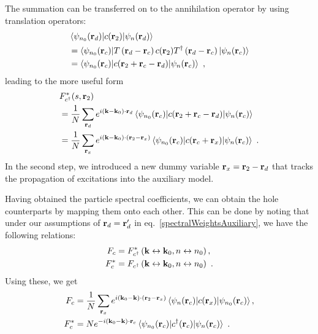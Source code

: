 \documentclass[reprint,hidelinks]{revtex4-2}
\begin{document}
The summation can be transferred on to the annihilation operator by using translation operators:
\begin{equation}\begin{aligned}
	&\braket{\psi_{n_0}({\bf r}_d)|c({\bf r}_2)|\psi_{n}({\bf r}_d)} \\
	&= \braket{\psi_{n_0}({\bf r}_c)|T\left({\bf r}_d - {\bf r}_c\right) c({\bf r}_2) T^\dagger\left({\bf r}_d - {\bf r}_c\right) |\psi_{n}({\bf r}_c)}\\
	&= \braket{\psi_{n_0}({\bf r}_c)| c({\bf r}_2 + {\bf r}_c - {\bf r}_d) |\psi_{n}({\bf r}_c)}~,
\end{aligned}\end{equation}
leading to the more useful form
\begin{equation}\begin{aligned}
	&F_{c^\dagger}^*(s, {\bf r}_2) \\
	&= \frac{1}{N}\sum_{{\bf r}_d} e^{i \left({\bf k}- {\bf k}_0\right)\cdot{\bf r}_d} \braket{\psi_{n_0}({\bf r}_c)| c({\bf r}_2 + {\bf r}_c - {\bf r}_d) |\psi_{n}({\bf r}_c)}\\
	&= \frac{1}{N}\sum_{{\bf r}_x} e^{i \left({\bf k}- {\bf k}_0\right)\cdot\left({\bf r}_2 - {\bf r}_x\right)} \braket{\psi_{n_0}({\bf r}_c)| c({\bf r}_c + {\bf r}_x) |\psi_{n}({\bf r}_c)}~.
\end{aligned}\end{equation}
In the second step, we introduced a new dummy variable \({\bf r}_x = {\bf r}_2 - {\bf r}_d\) that tracks the propagation of excitations into the auxiliary model.

Having obtained the particle spectral coefficients, we can obtain the hole counterparts by mapping them onto each other. This can be done by noting that under our assumptions of \({\bf r}_d = {\bf r}_d^\prime\) in eq.~\ref{spectralWeightsAuxiliary}, we have the following relations:
\begin{equation}\begin{aligned}
	F_{c} &= F_{c^\dagger}^*\left({\bf k}\leftrightarrow{\bf k}_0, n \leftrightarrow n_0\right),\\
	F_{c}^* &= F_{c^\dagger}\left({\bf k}\leftrightarrow{\bf k}_0, n \leftrightarrow n_0\right)~.
\end{aligned}\end{equation}
Using these, we get
\begin{equation}\begin{aligned}\label{spectralParticleHoleRelation}
	F_{c} &= \frac{1}{N}\sum_{{\bf r}_x} e^{i \left({\bf k}_0- {\bf k}\right)\cdot\left({\bf r}_2 - {\bf r}_x\right)} \braket{\psi_{n}({\bf r}_c)| c({\bf r}_x) |\psi_{n_0}({\bf r}_c)},\\
	F_{c}^* &= N e^{-i \left({\bf k}_0 - {\bf k}\right)\cdot{\bf r}_c} \braket{\psi_{n_0}({\bf r}_c)|c^\dagger({\bf r}_c)|\psi_{n}({\bf r}_c)}~.
\end{aligned}\end{equation}
\end{document}
